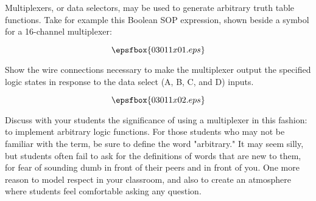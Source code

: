 

Multiplexers, or data selectors, may be used to generate arbitrary truth table functions.  Take for example this Boolean SOP expression, shown beside a symbol for a 16-channel multiplexer:

$$\epsfbox{03011x01.eps}$$

Show the wire connections necessary to make the multiplexer output the specified logic states in response to the data select (A, B, C, and D) inputs.







$$\epsfbox{03011x02.eps}$$







Discuss with your students the significance of using a multiplexer in this fashion: to implement arbitrary logic functions.  For those students who may not be familiar with the term, be sure to define the word "arbitrary."  It may seem silly, but students often fail to ask for the definitions of words that are new to them, for fear of sounding dumb in front of their peers and in front of you.  One more reason to model respect in your classroom, and also to create an atmosphere where students feel comfortable asking any question.




